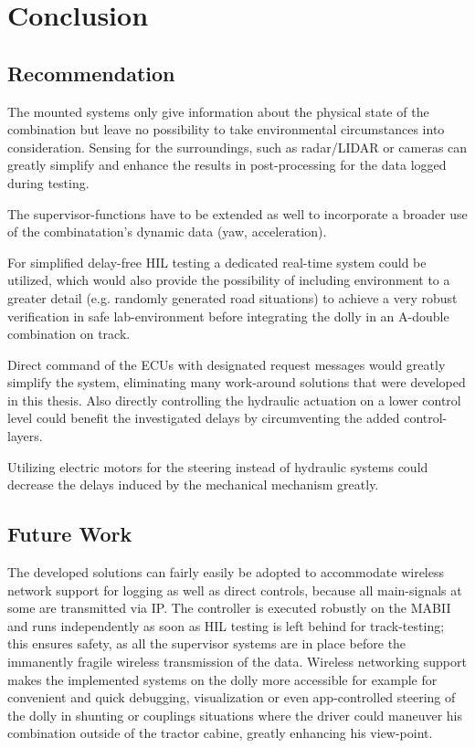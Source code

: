 \documentclass[ExampleMasters.tex]{subfiles}
\begin{document}
\clearpage
{\pagestyle{empty}\cleardoublepage}%
\chapter{Conclusion}
\label{chap:conclusion}

\section{Recommendation}
\label{sec:recommendation}

The mounted systems only give information about the physical state of the combination but leave no possibility to take environmental circumstances into consideration. Sensing for the surroundings, such as radar/LIDAR or cameras can greatly simplify and enhance the results in post-processing for the data logged during testing. 

The supervisor-functions have to be extended as well to incorporate a broader use of the combinatation's dynamic data (yaw, acceleration).  

For simplified delay-free \gls{HIL} testing a dedicated real-time system could be utilized, which would also provide the possibility of including environment to a greater detail (e.g. randomly generated road situations) to achieve a very robust verification in safe lab-environment before integrating the dolly in an A-double combination on track.

Direct command of the \gls{ECU}s with designated request messages would greatly simplify the system, eliminating many work-around solutions that were developed in this thesis. Also directly controlling the hydraulic actuation on a lower control level could benefit the investigated delays by circumventing the added control-layers.

Utilizing electric motors for the steering instead of hydraulic systems could decrease the delays induced by the mechanical mechanism greatly. 



\section{Future Work}
\label{sec:future_work}

The developed solutions can fairly easily be adopted to accommodate wireless network support for logging as well as direct controls, because all main-signals at some are transmitted via \gls{IP}. The controller is executed robustly on the \gls{MABII} and runs independently as soon as \gls{HIL} testing is left behind for track-testing; this ensures safety, as all the supervisor systems are in place before the immanently fragile wireless transmission of the data. Wireless networking support makes the implemented systems on the dolly more accessible for example for convenient and quick debugging, visualization or even app-controlled steering of the dolly in shunting or couplings situations where the driver could maneuver his combination outside of the tractor cabine, greatly enhancing his view-point.
\end{document}

